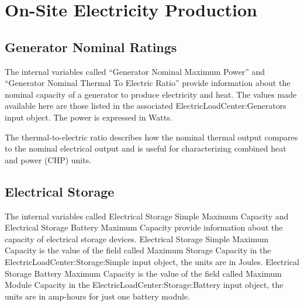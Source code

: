 \section{On-Site Electricity Production}\label{on-site-electricity-production-000}

\subsection{Generator Nominal Ratings}\label{generator-nominal-ratings}

The internal variables called ``Generator Nominal Maximum Power'' and ``Generator Nominal Thermal To Electric Ratio'' provide information about the nominal capacity of a generator to produce electricity and heat. The values made available here are those listed in the associated ElectricLoadCenter:Generators input object. The power is expressed in Watts.

The thermal-to-electric ratio describes how the nominal thermal output compares to the nominal electrical output and is useful for characterizing combined heat and power (CHP) units.

\subsection{Electrical Storage}\label{electrical-storage-000}

The internal variables called Electrical Storage Simple Maximum Capacity and Electrical Storage Battery Maximum Capacity provide information about the capacity of electrical storage devices. Electrical Storage Simple Maximum Capacity is the value of the field called Maximum Storage Capacity in the ElectricLoadCenter:Storage:Simple input object, the units are in Joules. Electrical Storage Battery Maximum Capacity is the value of the field called Maximum Module Capacity in the ElectricLoadCenter:Storage:Battery input object, the units are in amp-hours for just one battery module.
